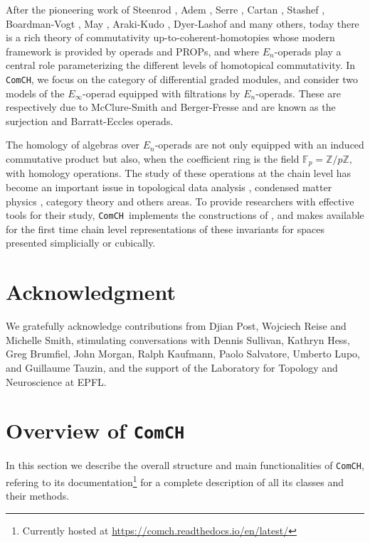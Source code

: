 \documentclass{amsart}
\newcommand{\comch}{\texttt{ComCH}}
\begin{document}
After the pioneering work of Steenrod \cite{Steenrod47, Steenrod62}, Adem \cite{Adem52}, Serre \cite{Serre53}, Cartan \cite{Cartan55}, Stashef \cite{Stasheff63}, Boardman-Vogt \cite{BoardmanVogt73}, May \cite{May70algebraic, May72geometry}, Araki-Kudo \cite{ArakiKudo56}, Dyer-Lashof \cite{DyerLashof62} and many others, today there is a rich theory of commutativity up-to-coherent-homotopies whose modern framework is provided by operads and PROPs, and where $E_n$-operads play a central role parameterizing the different levels of homotopical commutativity. In \comch, we focus on the category of differential graded modules, and consider two models of the $E_\infty$-operad equipped with filtrations by $E_n$-operads. These are respectively due to McClure-Smith \cite{McClureSmith03} and Berger-Fresse \cite{BergerFresse04} and are known as the surjection and Barratt-Eccles operads.

The homology of algebras over $E_n$-operads are not only equipped with an induced commutative product but also, when the coefficient ring is the field $\mathbb F_p = \mathbb Z/ p\mathbb Z$, with homology operations. The study of these operations at the chain level has become an important issue in topological data analysis \cite{medina2018persistence}, condensed matter physics \cite{kapustin2017fermionic}, category theory \cite{medina2020globular} and others areas. To provide researchers with effective tools for their study, \comch\, implements the constructions of \cite{medina2020chain}, and makes available for the first time chain level representations of these invariants for spaces presented simplicially or cubically.

\section*{Acknowledgment}
We gratefully acknowledge contributions from Djian Post, Wojciech Reise and Michelle Smith, stimulating conversations with Dennis Sullivan, Kathryn Hess, Greg Brumfiel, John Morgan, Ralph Kaufmann, Paolo Salvatore, Umberto Lupo, and Guillaume Tauzin, and the support of the Laboratory for Topology and Neuroscience at EPFL.

\section{Overview of \comch}

In this section we describe the overall structure and main functionalities of \comch, refering to its documentation\footnote{Currently hosted at \url{https://comch.readthedocs.io/en/latest/}} for a complete description of all its classes and their methods.
\end{document}

